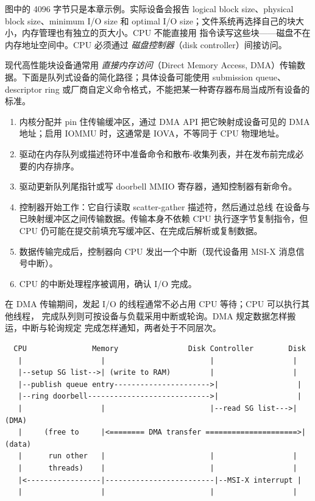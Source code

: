 \begin{filesystemlayout}
图中的 4096 字节只是本章示例。实际设备会报告 logical block size、physical block size、minimum I/O size 和 optimal I/O size；文件系统再选择自己的块大小，内存管理也有独立的页大小。CPU 不能直接用
 指令读写这些块——磁盘不在内存地址空间中。CPU 必须通过
\emph{磁盘控制器}（disk controller）间接访问。


现代高性能块设备通常用 \emph{直接内存访问}（Direct Memory Access,
DMA）传输数据。下面是队列式设备的简化路径；具体设备可能使用 submission queue、descriptor ring 或厂商自定义命令格式，不能把某一种寄存器布局当成所有设备的标准。

\begin{enumerate}\tightlist
\item 内核分配并 pin 住传输缓冲区，通过 DMA API 把它映射成设备可见的 DMA 地址；启用 IOMMU 时，这通常是 IOVA，不等同于 CPU 物理地址。
\item 驱动在内存队列或描述符环中准备命令和散布-收集列表，并在发布前完成必要的内存排序。
\item 驱动更新队列尾指针或写 doorbell MMIO 寄存器，通知控制器有新命令。
\item 控制器开始工作：它自行读取 scatter-gather 描述符，然后通过总线
  在设备与已映射缓冲区之间传输数据。传输本身不依赖 CPU 执行逐字节复制指令，但 CPU 仍可能在提交前填充写缓冲区、在完成后解析或复制数据。
\item 数据传输完成后，控制器向 CPU 发出一个中断（现代设备用 MSI-X
  消息信号中断）。
\item CPU 的中断处理程序被调用，确认 I/O 完成。
\end{enumerate}

在 DMA 传输期间，发起 I/O 的线程通常不必占用 CPU 等待；CPU 可以执行其他线程，
完成队列则可按设备与负载采用中断或轮询。DMA 规定数据怎样搬运，中断与轮询规定
完成怎样通知，两者处于不同层次。

\begin{lstlisting}
  CPU               Memory                Disk Controller        Disk
   |                  |                        |                  |
   |--setup SG list-->| (write to RAM)         |                  |
   |--publish queue entry---------------------->|                  |
   |--ring doorbell---------------------------->|                  |
   |                  |                        |--read SG list--->| (DMA)
   |     (free to     |<======== DMA transfer =====================>| (data)
   |      run other   |                        |                  |
   |      threads)    |                        |                  |
   |<-----------------|-------------------------|--MSI-X interrupt |
   |                  |                        |                  |
\end{lstlisting}


\end{filesystemlayout}
